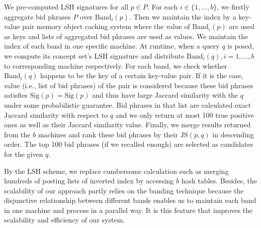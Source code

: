 We pre-computed LSH signatures for all $p\in{}P$.%
For each $i\in\{1,\ldots,b\}$, we firstly aggregate bid
phrases $P$ over $\text{Band}_{i}(p)$.
Then we maintain the index by a key-value pair memory object caching
system where the value of $\text{Band}_{i}(p)$ are used as keys and lists of
aggregated bid phrases are used as values.
We maintain the index of each band in one specific machine.
At runtime, when a query $q$ is posed, we compute its concept set's LSH
signature and distribute $\text{Band}_{i}(q),i=1,\ldots,b$ to corresponding machine
respectively.
For each band, we check whether $\text{Band}_{i}(q)$ happens to be
the key of a certain key-value pair.
If it is the case, value (i.e., list of bid phrases) of the pair is
considered because these bid phrases satisfies
$\text{Sig}(p)=\text{Sig}(p)$ and thus have large Jaccard similarity with
the $q$ under some probabilistic guarantee.
Bid phrases in that list are calculated exact Jaccard similarity with
respect to $q$ and we only return at most 100 true positive ones as
well as their Jaccard similarity value.
Finally, we merge results returned from the $b$ machines
and rank these bid phrases by their $\text{JS}(p,q)$ in descending
order.
The top 100 bid phrases (if we recalled enough) are selected as
candidates for the given $q$.


By the LSH scheme, we replace cumbersome calculation such as merging
hundreds of posting lists of inverted index by %
accessing $b$ hash tables.
Besides, the scalability of our approach partly relies on the banding
technique because the disjunctive relationship between different bands enables
us to maintain each band in one machine and process in a parallel way.
It is this feature that improves the scalability and efficiency of our
system.
